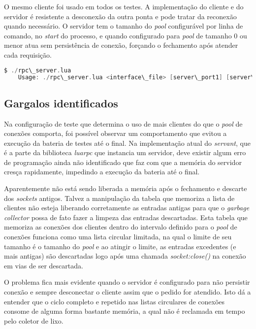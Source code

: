 \documentclass[11pt]{article}
\begin{document}
O mesmo cliente foi usado em todos os testes. A implementação do cliente e do
servidor é resistente a desconexão da outra ponta e pode tratar da reconexão
quando necessário. O servidor tem o tamanho do \textit{pool} configurável por
linha de comando, no \textit{start} do processo, e quando configurado para
\textit{pool} de tamanho 0 ou menor atua sem persistência de conexão, forçando o
fechamento após atender cada requisição.

\begin{lstlisting}[label={commandline},language=C,caption=Linha de comando]
    $ ./rpc\_server.lua
    Usage: ./rpc\_server.lua <interface\_file> [server\_port1] [server\_port2] [pool\_size]
\end{lstlisting}

\subsection{Gargalos identificados}\label{subsec:bottle}

Na configuração de teste que determina o uso de mais clientes do que o
\textit{pool} de conexões comporta, foi possível observar um comportamento que
evitou a execução da bateria de testes até o final. Na implementação atual do
\textit{servant}, que é a parte da biblioteca \textit{luarpc} que instancia
um servidor, deve existir algum erro de programação ainda não identificado que
faz com que a memória do servidor cresça rapidamente, impedindo a execução da
bateria até o final.

Aparentemente não está sendo liberada a memória após o
fechamento e descarte dos \textit{sockets} antigos. Talvez a manipulação da
tabela que memoriza a lista de clientes não esteja liberando corretamente as
entradas antigas para que o \textit{garbage collector} possa de fato fazer a
limpeza das entradas descartadas. Esta tabela que memoriza as conexões dos
clientes dentro do intervalo definido para o \textit{pool} de conexões funciona
como uma lista circular limitada, na qual o limite de seu tamanho é o tamanho do
\textit{pool} e ao atingir o limite, as entradas excedentes (e mais antigas) são
descartadas logo após uma chamada \textit{socket:close()} na conexão em vias de
ser descartada.

O problema fica mais evidente quando o servidor é configurado para não persistir
conexão e sempre desconectar o cliente assim que o pedido for atendido. Isto dá
a entender que o ciclo completo e repetido nas listas circulares de conexões
consome de alguma forma bastante memória, a qual não é reclamada em tempo pelo
coletor de lixo.
\end{document}

